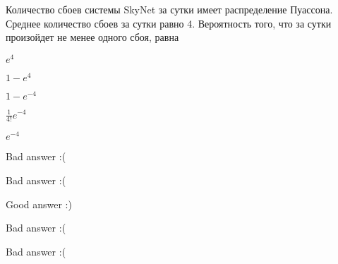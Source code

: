 
\begin{question}
Количество сбоев системы SkyNet за сутки имеет распределение Пуассона.
Среднее количество сбоев за сутки равно 4. Вероятность того, что за
сутки произойдет не менее одного сбоя, равна
\begin{answerlist}
  \item \(e^4\)
  \item \(1-e^4\)
  \item \(1- e^{-4}\)
  \item \(\tfrac{1}{4!}e^{-4}\)
  \item \(e^{-4}\)
\end{answerlist}
\end{question}

\begin{solution}
\begin{answerlist}
  \item Bad answer :(
  \item Bad answer :(
  \item Good answer :)
  \item Bad answer :(
  \item Bad answer :(
\end{answerlist}
\end{solution}


